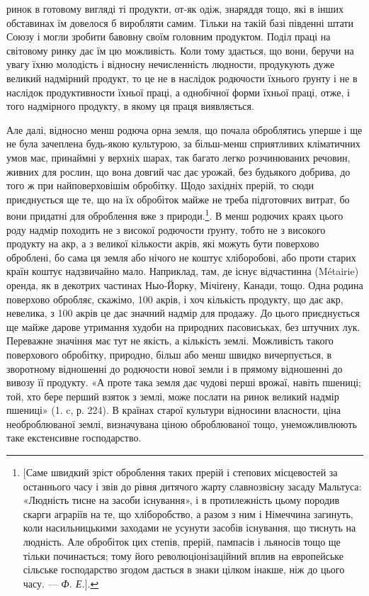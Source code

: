 \parcont{}  %
ринок в готовому вигляді ті продукти, от-як одіж, знаряддя тощо, які в інших
обставинах їм довелося б виробляти самим. Тільки на такій базі південні штати
Союзу і могли зробити бавовну своїм головним продуктом. Поділ праці на світовому
ринку дає їм цю можливість. Коли тому здається, що вони, беручи
на увагу їхню молодість і відносну нечисленність людности, продукують дуже
великий надмірний продукт, то це не в наслідок родючости їхнього ґрунту і не
в наслідок продуктивности їхньої праці, а однобічної форми їхньої праці, отже,
і того надмірного продукту, в якому ця праця виявляється.

Але далі, відносно менш родюча орна земля, що почала оброблятись уперше
і ще не була зачеплена будь-якою культурою, за більш-менш сприятливих
кліматичних умов має, принаймні у верхніх шарах, так багато легко розчинюваних
речовин, живних для рослин, що вона довгий час дає урожай, без будьякого
добрива, до того ж при найповерховішім обробітку. Щодо західніх прерій,
то сюди приєднується ще те, що на їх обробіток майже не треба підготовчих
витрат, бо вони придатні для оброблення вже з природи.\footnote{
[Саме швидкий зріст оброблення таких прерій і степових місцевостей за останнього часу і звів до
рівня дитячого жарту славнозвісну засаду Мальтуса: «Людність тисне на засоби існування», і в
протилежність цьому породив скарги аграріїв на те, що хліборобство, а разом з ним і Німеччина
загинуть, коли насильницькими заходами не усунути засобів існування, що тиснуть на людність. Але
обробіток цих степів, прерій, пампасів і льяносів тощо ще тільки починається; тому його
революціонізаційний вплив на европейське сільське господарство згодом дасться в знаки цілком інакше,
ніж до цього часу. — \emph{Ф. Е.}].
}. В менш родючих
краях цього роду надмір походить не з високої родючости ґрунту, тобто не з
високого продукту на акр, а з великої кількости акрів, які можуть бути поверхово
оброблені, бо сама ця земля або нічого не коштує хліборобові, або проти
старих країн коштує надзвичайно мало. Наприклад, там, де існує відчастинна
(Métairie) оренда, як в декотрих частинах Ныо-Йорку, Мічіґену, Канади, тощо.
Одна родина поверхово обробляє, скажімо, 100 акрів, і хоч кількість продукту,
що дає акр, невелика, з 100 акрів це дає значний надмір для продажу. До
цього приєднується ще майже дарове утримання худоби на природних пасовиськах,
без штучних лук. Переважне значіння має тут не якість, а кількість землі.
Можливість такого поверхового обробітку, природно, більш або менш швидко
вичерпується, в зворотному відношенні до родючости нової земли і в прямому відношенні до вивозу її
продукту. «А проте така земля дає чудові перші врожаї, навіть
пшениці; той, хто бере перший взяток з землі, може послати на ринок великий
надмір пшениці» (1. c, р. 224). В країнах старої культури відносини власности,
ціна необроблюваної землі, визначувана ціною оброблюваної тощо, унеможливлюють
таке екстенсивне господарство.

